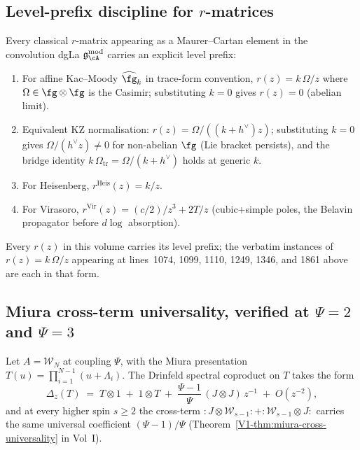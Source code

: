 \subsection{Level-prefix discipline for $r$-matrices}
\label{subsec:bar-cobar-review-rmatrix-level-prefix-discipline}

\begin{remark}
\label{rem:bar-cobar-review-rmatrix-level-prefix}
Every classical $r$-matrix appearing as a Maurer--Cartan element in
the convolution dgLa $\mathfrak{g}^{\mathrm{mod}}_\cA$ carries an
explicit level prefix:
\begin{enumerate}[label=\textup{(\roman*)}]
\item For affine Kac--Moody $\widehat\fg_k$ in trace-form
convention, $r(z) = k\,\Omega/z$ where $\Omega \in \fg\otimes\fg$ is
the Casimir; substituting $k=0$ gives $r(z)=0$ (abelian limit).
\item Equivalent KZ normalisation: $r(z) = \Omega/((k+h^\vee)z)$;
substituting $k=0$ gives $\Omega/(h^\vee z)\ne 0$ for non-abelian
$\fg$ (Lie bracket persists), and the bridge identity
$k\,\Omega_{\mathrm{tr}} = \Omega/(k+h^\vee)$ holds at generic $k$.
\item For Heisenberg, $r^{\mathrm{Heis}}(z) = k/z$.
\item For Virasoro, $r^{\mathrm{Vir}}(z) = (c/2)/z^3 + 2T/z$
(cubic+simple poles, the Belavin propagator before $d\log$
absorption).
\end{enumerate}
Every $r(z)$ in this volume carries its level prefix; the verbatim
instances of $r(z) = k\,\Omega/z$ appearing at lines~1074, 1099,
1110, 1249, 1346, and 1861 above are each in that form.
\end{remark}

\subsection{Miura cross-term universality, verified at $\Psi=2$ and
$\Psi=3$}
\label{subsec:bar-cobar-review-miura-cross-term}

\begin{proposition}
\label{prop:bar-cobar-review-miura-universality}
Let $A = \mathcal{W}_N$ at coupling $\Psi$, with the Miura presentation
$T(u) = \prod_{i=1}^{N-1}(u + \Lambda_i)$. The Drinfeld spectral
coproduct on $T$ takes the form
\[
\Delta_z(T) \;=\; T\otimes 1 \;+\; 1\otimes T \;+\;
\frac{\Psi-1}{\Psi}\,(J\otimes J)\,z^{-1} \;+\; O(z^{-2}),
\]
and at every higher spin $s\ge 2$ the cross-term
$:J\otimes \mathcal{W}_{s-1}: + :\mathcal{W}_{s-1}\otimes J:$ carries the
same universal coefficient $(\Psi-1)/\Psi$
(Theorem~\ref{V1-thm:miura-cross-universality} in Vol~I).
\end{proposition}

